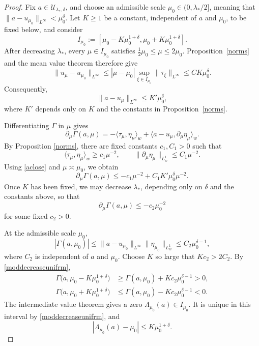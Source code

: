 \documentclass[11pt,a4paper]{article}
\numberwithin{equation}{section}
\theoremstyle{plain}
\theoremstyle{remark}
\begin{document}
\begin{proof}
Fix $a\in\mathcal U_{\lambda_*,\delta}$, and choose an admissible
scale $\mu_0\in(0,\lambda_*/2]$, meaning that $\|a-u_{\mu_0}\|_{L^\infty}<\mu_0^\delta$. Let $K\geq1$ be a constant, independent of $a$ and
$\mu_0$, to be fixed below, and consider
$$
I_{\mu_0}
:=
\left[
\mu_0-K\mu_0^{1+\delta},
\mu_0+K\mu_0^{1+\delta}
\right].
$$
After decreasing $\lambda_*$, every $\mu\in I_{\mu_0}$
satisfies $\frac12\mu_0\leq\mu\leq2\mu_0$. Proposition~\ref{norms} and the mean value theorem therefore give
$$
\|u_\mu-u_{\mu_0}\|_{L^\infty}
\leq
|\mu-\mu_0|
\sup_{\xi\in I_{\mu_0}}\|\tau_\xi\|_{L^\infty}
\leq
C K\mu_0^\delta.
$$
Consequently,
\begin{equation}\label{aclose}
\|a-u_\mu\|_{L^\infty}
\leq
K'\mu_0^\delta,
\end{equation}
where $K'$ depends only on $K$ and the constants in
Proposition~\ref{norms}.

Differentiating $\Gamma$ in $\mu$ gives
$$
\partial_\mu \Gamma(a,\mu)
=
-\langle\tau_\mu,\eta_\mu\rangle_w
+
\langle a-u_\mu,\partial_\mu\eta_\mu\rangle_w.
$$
By Proposition \ref{norms}, there are fixed constants
$c_1,C_1>0$ such that
$$
\langle\tau_\mu,\eta_\mu\rangle_w\geq c_1\mu^{-2},
\qquad
\|\partial_\mu\eta_\mu\|_{L_w^1}\leq C_1\mu^{-2}.
$$
Using \eqref{aclose} and $\mu\asymp\mu_0$,
we obtain
$$
\partial_\mu \Gamma(a,\mu)
\leq
-c_1\mu^{-2}
+
C_1K'\mu_0^\delta\mu^{-2}.
$$
Once $K$ has been fixed, we may decrease $\lambda_*$, depending
only on $\delta$ and the constants above, so that
\begin{equation}\label{moddecreaseunifrm}
\partial_\mu \Gamma(a,\mu)
\leq
-c_2\mu_0^{-2}
\end{equation}
for some fixed $c_2>0$.

At the admissible scale $\mu_0$,
$$
|\Gamma(a,\mu_0)|
\leq
\|a-u_{\mu_0}\|_{L^\infty}
\|\eta_{\mu_0}\|_{L_w^1}
\leq
C_2\mu_0^{\delta-1},
$$
where $C_2$ is independent of $a$ and $\mu_0$. Choose
$K$ so large that $Kc_2>2C_2$. By \eqref{moddecreaseunifrm},
$$
\begin{aligned}
\Gamma\bigl(a,\mu_0-K\mu_0^{1+\delta}\bigr)
&\geq
\Gamma(a,\mu_0)+Kc_2\mu_0^{\delta-1}>0,\\
\Gamma\bigl(a,\mu_0+K\mu_0^{1+\delta}\bigr)
&\leq
\Gamma(a,\mu_0)-Kc_2\mu_0^{\delta-1}<0.
\end{aligned}
$$
The intermediate value theorem gives a zero $\Lambda_{\mu_0}(a)\in I_{\mu_0}$. It is unique in this interval by
\eqref{moddecreaseunifrm}, and
\begin{equation}\label{localrootbnd}
|\Lambda_{\mu_0}(a)-\mu_0|
\leq
K\mu_0^{1+\delta}.
\end{equation}


\end{proof}
\end{document}
